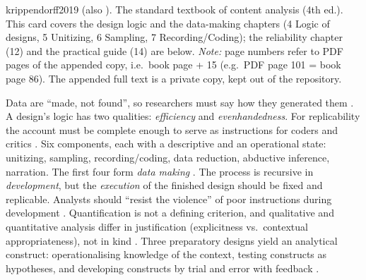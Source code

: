 \begin{papercard}{krippendorff2019}
   (also  ). The standard textbook of content analysis (4th ed.). This card covers the design logic and the data-making chapters (4 Logic of designs, 5 Unitizing, 6 Sampling, 7 Recording/Coding); the reliability chapter (12) and the practical guide (14) are below. \emph{Note:} page numbers refer to PDF pages of the appended copy, i.e.\ book page + 15 (e.g.\ PDF page 101 = book page 86). The appended full text is a private copy, kept out of the repository.

 Data are ``made, not found'', so researchers must say how they generated them . A design's logic has two qualities: \emph{efficiency} and \emph{evenhandedness}. For replicability the account must be complete enough to serve as instructions for coders and critics . Six components, each with a descriptive and an operational state: unitizing, sampling, recording/coding, data reduction, abductive inference, narration. The first four form \emph{data making} . The process is recursive in \emph{development}, but the \emph{execution} of the finished design should be fixed and replicable. Analysts should ``resist the violence'' of poor instructions during development . Quantification is not a defining criterion, and qualitative and quantitative analysis differ in justification (explicitness vs.\ contextual appropriateness), not in kind . Three preparatory designs yield an analytical construct: operationalising knowledge of the context, testing constructs as hypotheses, and developing constructs by trial and error with feedback .


\end{papercard}
